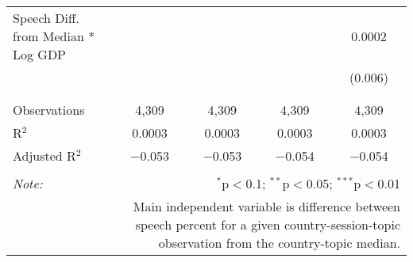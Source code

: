 \begin{table}[!htbp]
\begin{tabular}{@{\extracolsep{5pt}}lcccc}
 Speech Diff. from Median * Log GDP &  &  &  & 0.0002 \\ 
  &  &  &  & (0.006) \\ 
  & & & & \\ 
\hline \\[-1.8ex] 
Observations & 4,309 & 4,309 & 4,309 & 4,309 \\ 
R$^{2}$ & 0.0003 & 0.0003 & 0.0003 & 0.0003 \\ 
Adjusted R$^{2}$ & $-$0.053 & $-$0.053 & $-$0.054 & $-$0.054 \\ 
\hline 
\hline \\[-1.8ex] 
\textit{Note:}  & \multicolumn{4}{r}{$^{*}$p$<$0.1; $^{**}$p$<$0.05; $^{***}$p$<$0.01} \\ 
 & \multicolumn{4}{r}{Main independent variable is difference between speech percent for a given country-session-topic observation from the country-topic median.} \\ 
\end{tabular} 
\end{table} 
